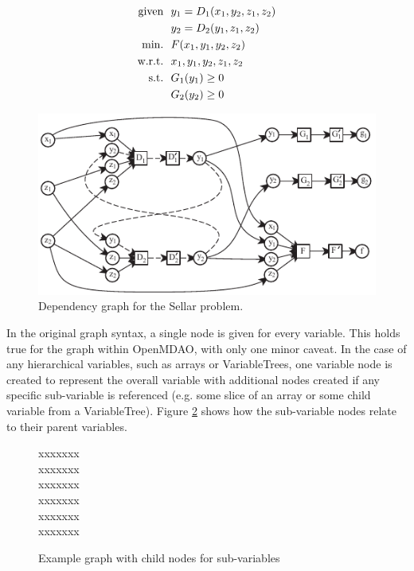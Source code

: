 \documentclass[]{aiaa-tc} %
\newcommand{\txt}{\textrm}
\begin{document}
    \begin{align}
        \txt{given} & \ \ y_1 = D_1(x_1,y_2,z_1,z_2) \notag
        \\      & \ \ y_2 = D_2(y_1,z_1,z_2) \notag
        \\\txt{min.} &\ \ F(x_1,y_1,y_2,z_2) \notag
        \\\txt{w.r.t.} & \ \ x_1,y_1,y_2,z_1,z_2 \notag
        \\\txt{s.t.} & \ \ G_1(y_1) \geq 0 \notag
        \\     & \ \ G_2(y_2) \geq 0
        \label{eqn:sellar_formulation}
    \end{align}


    \begin{figure}[!htb]\begin{center}
      \includegraphics[width=.8\textwidth]{images/sellar_cycles}
      \caption{ Dependency graph for the Sellar problem. \label{fig:sellar_graph}}
    \end{center}\end{figure}

    In the original graph syntax, a single node is given for every variable. This holds true for the graph 
    within OpenMDAO, with only one minor caveat. In the case of any hierarchical variables, such as arrays
    or VariableTrees, one variable node is created to represent the overall variable with additional nodes
    created if any specific sub-variable is referenced (e.g. some slice of an array or some child variable from a 
    VariableTree). Figure \ref{fig:subvars} shows how the sub-variable nodes relate to their parent variables. 

     \begin{figure}[!htb]\begin{center}
      xxxxxxx\\xxxxxxx\\xxxxxxx\\xxxxxxx\\xxxxxxx\\xxxxxxx\\
      \caption{ Example graph with child nodes for sub-variables \label{fig:subvars}}
    \end{center}\end{figure}
\end{document}
